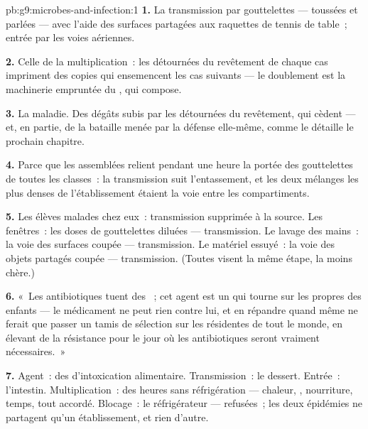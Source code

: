 \begin{solution}{pb:g9:microbes-and-infection:1}
\textbf{1.} La transmission par gouttelettes --- toussées
et parlées --- avec l'aide des surfaces partagées aux
raquettes de tennis de table~; entrée par les voies
aériennes.

\textbf{2.} Celle de la multiplication~: les 
détournées du revêtement de chaque cas impriment des copies
qui ensemencent les cas suivants --- le doublement est la
machinerie empruntée du , qui compose.

\textbf{3.} La maladie. Des dégâts subis par les 
détournées du revêtement, qui cèdent --- et, en partie, de
la bataille menée par la défense elle-même, comme le
détaille le prochain chapitre.

\textbf{4.} Parce que les assemblées relient pendant une
heure la portée des gouttelettes de toutes les classes~: la
transmission suit l'entassement, et les deux mélanges les
plus denses de l'établissement étaient la voie entre les
compartiments.

\textbf{5.} Les élèves malades chez eux~: transmission
supprimée à la source. Les fenêtres~: les doses de
gouttelettes diluées --- transmission. Le lavage des
mains~: la voie des surfaces coupée --- transmission. Le
matériel essuyé~: la voie des objets partagés coupée ---
transmission. (Toutes visent la même étape, la moins chère.)

\textbf{6.} «~Les antibiotiques tuent des ~; cet
agent est un  qui tourne sur les propres  des
enfants --- le médicament ne peut rien contre lui, et en
répandre quand même ne ferait que passer un tamis de
sélection sur les  résidentes de tout le monde, en
élevant de la résistance pour le jour où les antibiotiques
seront vraiment nécessaires.~»

\textbf{7.} Agent~: des  d'intoxication
alimentaire. Transmission~: le dessert. Entrée~: l'intestin.
Multiplication~: des heures sans réfrigération --- chaleur,
, nourriture, temps, tout accordé. Blocage~: le
réfrigérateur ---  refusées~; les deux épidémies
ne partagent qu'un établissement, et rien d'autre.


\end{solution}
